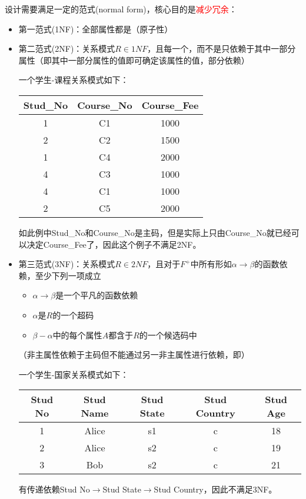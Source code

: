 设计需要满足一定的范式(normal form)，核心目的是\textcolor{red}{减少冗余}：
\begin{itemize}
	\item 第一范式(1NF)：全部属性都是（原子性）

	\item 第二范式(2NF)：关系模式$R\in 1NF$，且每一个，而不是只依赖于其中一部分属性（即其中一部分属性的值即可确定该属性的值，部分依赖）
	\begin{example}
	一个学生-课程关系模式如下：
	\begin{center}
	\begin{tabular}{|c|c|c|}\hline
		Stud\_No & Course\_No & Course\_Fee\\\hline
		1 & C1 & 1000\\
		2 & C2 & 1500\\
		1 & C4 & 2000\\
		4 & C3 & 1000\\
		4 & C1 & 1000\\
		2 & C5 & 2000\\\hline
	\end{tabular}
	\end{center}
	如此例中Stud\_No和Course\_No是主码，但是实际上只由Course\_No就已经可以决定Course\_Fee了，因此这个例子不满足2NF。
	\end{example}

	\item 第三范式(3NF)：关系模式$R\in 2NF$，且对于$F^+$中所有形如$\alpha\to\beta$的函数依赖，至少下列一项成立
	\begin{itemize}
		\item $\alpha\to\beta$是一个平凡的函数依赖
		\item $\alpha$是$R$的一个超码
		\item $\beta-\alpha$中的每个属性$A$都含于$R$的一个候选码中
	\end{itemize}
	（非主属性依赖于主码但不能通过另一非主属性进行依赖，即）
	\begin{example}
	一个学生-国家关系模式如下：
	\begin{center}
	\begin{tabular}{ccccc}\hline
	Stud No & Stud Name & Stud State & Stud Country & Stud Age\\\hline
	1 & Alice & s1 & c & 18\\
	2 & Alice & s2 & c & 19\\
	3 & Bob & s2 & c & 21\\\hline
	\end{tabular}
	\end{center}
	有传递依赖Stud No$\to$Stud State$\to$Stud Country，因此不满足3NF。
	\end{example}


\end{itemize}
